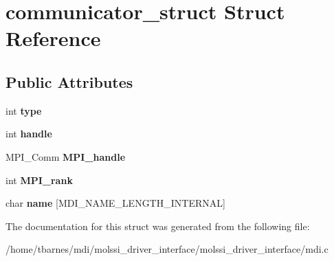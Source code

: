\hypertarget{structcommunicator__struct}{\section{communicator\-\_\-struct Struct Reference}
\label{structcommunicator__struct}
}
\subsection*{Public Attributes}
\begin{DoxyCompactItemize}
\item 
\hypertarget{structcommunicator__struct_a0c9df913dafd6858581dab0cffd54a89}{int {\bfseries type}}\label{structcommunicator__struct_a0c9df913dafd6858581dab0cffd54a89}

\item 
\hypertarget{structcommunicator__struct_a93b2925f34f7610fd9d97fb6e7a439c9}{int {\bfseries handle}}\label{structcommunicator__struct_a93b2925f34f7610fd9d97fb6e7a439c9}

\item 
\hypertarget{structcommunicator__struct_aa79e48db3b6e63fbb39e6d43e41c752d}{M\-P\-I\-\_\-\-Comm {\bfseries M\-P\-I\-\_\-handle}}\label{structcommunicator__struct_aa79e48db3b6e63fbb39e6d43e41c752d}

\item 
\hypertarget{structcommunicator__struct_ad9e1362c930e8c07d7d9ff2e18cfa9b3}{int {\bfseries M\-P\-I\-\_\-rank}}\label{structcommunicator__struct_ad9e1362c930e8c07d7d9ff2e18cfa9b3}

\item 
\hypertarget{structcommunicator__struct_a8e4a395e54b77f82d50cb0fb1ee96c06}{char {\bfseries name} \mbox{[}M\-D\-I\-\_\-\-N\-A\-M\-E\-\_\-\-L\-E\-N\-G\-T\-H\-\_\-\-I\-N\-T\-E\-R\-N\-A\-L\mbox{]}}\label{structcommunicator__struct_a8e4a395e54b77f82d50cb0fb1ee96c06}

\end{DoxyCompactItemize}


The documentation for this struct was generated from the following file\-:\begin{DoxyCompactItemize}
\item 
/home/tbarnes/mdi/molssi\-\_\-driver\-\_\-interface/molssi\-\_\-driver\-\_\-interface/mdi.\-c\end{DoxyCompactItemize}
